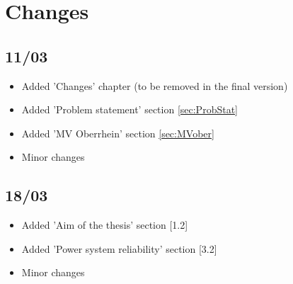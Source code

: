 \chapter{Changes}

\section{11/03}
\begin{itemize}
    \item Added 'Changes' chapter (to be removed in the final version)
    \item Added 'Problem statement' section \ref{sec:ProbStat}
    \item Added 'MV Oberrhein' section \ref{sec:MVober}
    \item Minor changes
\end{itemize}

\section{18/03}
\begin{itemize}
    \item Added 'Aim of the thesis' section [1.2]
    \item Added 'Power system reliability' section [3.2]
    \item Minor changes
\end{itemize}